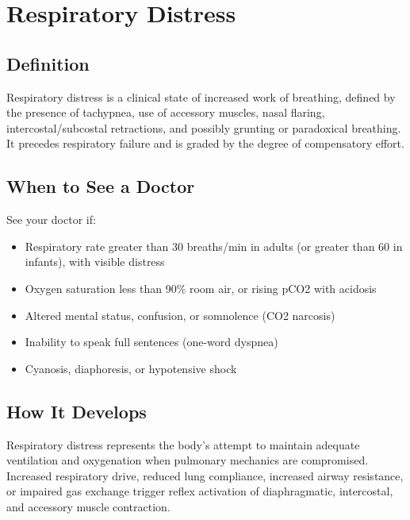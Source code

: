 \chapter{Respiratory Distress}

\section*{Definition}
Respiratory distress is a clinical state of increased work of breathing, defined by the presence of tachypnea, use of accessory muscles, nasal flaring, intercostal/subcostal retractions, and possibly grunting or paradoxical breathing. It precedes respiratory failure and is graded by the degree of compensatory effort.

\section*{When to See a Doctor}
See your doctor if:
\begin{itemize}
  \item Respiratory rate greater than 30 breaths/min in adults (or greater than 60 in infants), with visible distress
  \item Oxygen saturation less than 90\% room air, or rising pCO2 with acidosis
  \item Altered mental status, confusion, or somnolence (CO2 narcosis)
  \item Inability to speak full sentences (one-word dyspnea)
  \item Cyanosis, diaphoresis, or hypotensive shock
\end{itemize}

\section*{How It Develops}
Respiratory distress represents the body's attempt to maintain adequate ventilation and oxygenation when pulmonary mechanics are compromised. Increased respiratory drive, reduced lung compliance, increased airway resistance, or impaired gas exchange trigger reflex activation of diaphragmatic, intercostal, and accessory muscle contraction.

